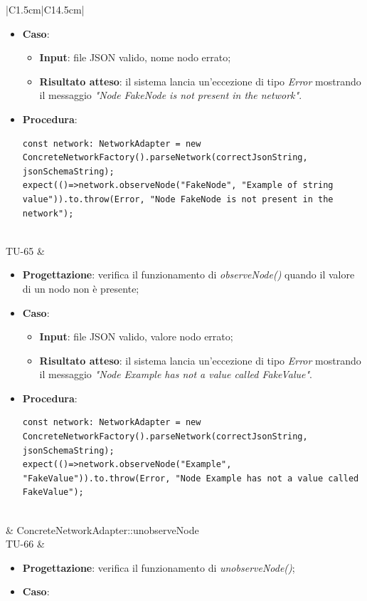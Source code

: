 \begin{longtable}{|C{1.5cm}|C{14.5cm}|}
\begin{itemize}
		\item \textbf{Caso}: 
		\begin{itemize}
			\item \textbf{Input}: file JSON valido, nome nodo errato;
			\item \textbf{Risultato atteso}: il sistema lancia un'eccezione di tipo \emph{Error} mostrando il messaggio \emph{"Node FakeNode is not present in the network"}.
		\end{itemize}
		\item \textbf{Procedura}:
		\begin{lstlisting}
const network: NetworkAdapter = new ConcreteNetworkFactory().parseNetwork(correctJsonString, jsonSchemaString);
expect(()=>network.observeNode("FakeNode", "Example of string value")).to.throw(Error, "Node FakeNode is not present in the network");
		\end{lstlisting}
	\end{itemize}\\
	\hline
	{TU-65} &
	\begin{itemize}
		\item \textbf{Progettazione}: verifica il funzionamento di \emph{observeNode()} quando il valore di un nodo non è presente;
		\item \textbf{Caso}: 
		\begin{itemize}
			\item \textbf{Input}: file JSON valido, valore nodo errato;
			\item \textbf{Risultato atteso}: il sistema lancia un'eccezione di tipo \emph{Error} mostrando il messaggio \emph{"Node Example has not a value called FakeValue"}.
		\end{itemize}
		\item \textbf{Procedura}:
		\begin{lstlisting}
const network: NetworkAdapter = new ConcreteNetworkFactory().parseNetwork(correctJsonString, jsonSchemaString);
expect(()=>network.observeNode("Example", "FakeValue")).to.throw(Error, "Node Example has not a value called FakeValue");
		\end{lstlisting}
	\end{itemize}\\
	\hline
{} & ConcreteNetworkAdapter::unobserveNode
\\ \hline
{TU-66} &
\begin{itemize}
	\item \textbf{Progettazione}: verifica il funzionamento di \emph{unobserveNode()};
	\item \textbf{Caso}: 

\end{itemize}
\end{longtable}
